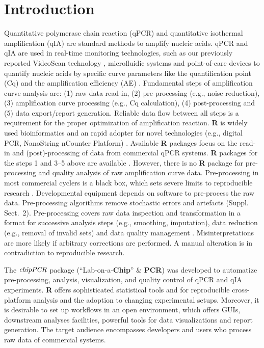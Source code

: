 \documentclass{bioinfo}
\begin{document}
\section{Introduction}

Quantitative polymerase chain reaction (qPCR) and quantitative isothermal 
amplification (qIA) are standard methods to amplify nucleic acids. qPCR and qIA are used in 
real-time monitoring technologies, such as our previously reported VideoScan 
technology \citep{roediger_highly_2013,spiess_impact_2014}, microfluidic systems and point-of-care 
devices to quantify nucleic acids by specific curve parameters like the 
quantification point (Cq) and the amplification efficiency (AE) 
\citep{pabinger_2014,rodiger_nucleic_2014}. Fundamental steps of amplification 
curve analysis are: (1) raw data read-in, (2) pre-processing (e.g., noise 
reduction), (3) amplification curve processing 
(e.g., Cq calculation), (4) post-processing and (5) data 
export/report generation. Reliable data flow between all steps is a requirement for the 
proper optimization of amplification reaction\citep{cobb_1994}. \textbf{R} is widely used bioinformatics 
and an rapid adopter for novel technologies (e.g., digital PCR, 
NanoString nCounter Platform) \citep{waggott_2012,pabinger_2014}. 
Available \textbf{R} packages focus on the read-in and (post)-processing of data 
from commercial qPCR systems. \textbf{R} packages for the steps 1 and 3--5 above 
are available \citep{perkins_2012,gehlenborg_2013,mccall_2014,pabinger_2014}. 
However, there is no \textbf{R} package for pre-processing and quality analysis 
of raw amplification curve data. Pre-processing in most commercial cyclers is a 
black box, which sets severe limits to reproducible research 
\citep{Leeper_2014}. Developmental equipment depends on software to 
pre-process the raw data. Pre-processing algorithms remove stochastic errors and 
artefacts (Suppl. Sect.~2). Pre-processing covers raw data inspection and 
transformation in a format for successive analysis steps (e.g., smoothing, 
imputation), data reduction (e.g., removal of invalid sets) and data quality 
management \citep{spiess_impact_2014}. Misinterpretations are more likely if 
arbitrary corrections are performed. A manual alteration is in contradiction to 
reproducible research.

The $\emph{chipPCR}$ package (``Lab-on-a-\textbf{Chip}'' \& \textbf{PCR}) was 
developed to automatize pre-processing, analysis, visualization, and quality 
control of qPCR and qIA experiments. \textbf{R} offers sophisticated statistical 
tools and for reproducible cross-platform analysis and the adoption to changing 
experimental setups. Moreover, it is desirable to set up workflows in an open 
environment, which offers GUIs, downstream analyses facilities, powerful tools 
for data visualizations and report generation. The target audience encompasses 
developers and users who process raw data of commercial systems.
\end{document}
